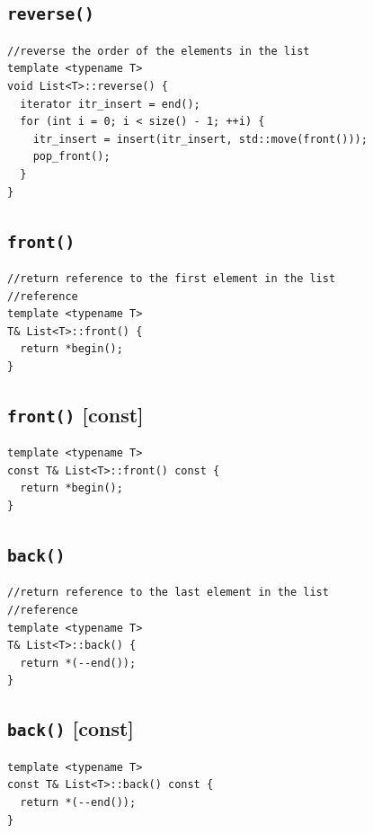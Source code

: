 \documentclass[11pt]{book}
\begin{document}
\subsection{\texttt{reverse()}}
\label{sec:org75c7361}
\begin{verbatim}
//reverse the order of the elements in the list
template <typename T>
void List<T>::reverse() {
  iterator itr_insert = end();
  for (int i = 0; i < size() - 1; ++i) {
    itr_insert = insert(itr_insert, std::move(front()));
    pop_front();
  }
}
\end{verbatim}
\subsection{\texttt{front()}}
\label{sec:org88460a3}
\begin{verbatim}
//return reference to the first element in the list
//reference
template <typename T>
T& List<T>::front() {
  return *begin();
}
\end{verbatim}
\subsection{\texttt{front()} [const]}
\label{sec:orgd3bce3f}
\begin{verbatim}
template <typename T>
const T& List<T>::front() const {
  return *begin();
}
\end{verbatim}
\subsection{\texttt{back()}}
\label{sec:orgd022481}
\begin{verbatim}
//return reference to the last element in the list
//reference 
template <typename T>
T& List<T>::back() {
  return *(--end());
}
\end{verbatim}
\subsection{\texttt{back()} [const]}
\label{sec:org815d5ea}
\begin{verbatim}
template <typename T>
const T& List<T>::back() const {
  return *(--end());
}
\end{verbatim}
\end{document}
